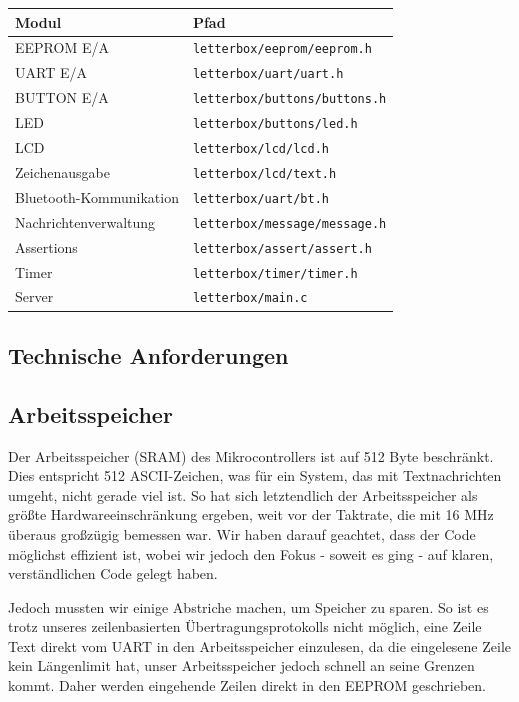 \documentclass[ngerman]{article}
\begin{document}
\begin{tabular}{|l|l|}
    \hline
    {\bf Modul} & {\bf Pfad} \\
    \hline
    \hline
    EEPROM E/A & {\tt letterbox/eeprom/eeprom.h} \\
    \hline
    UART E/A & {\tt letterbox/uart/uart.h} \\
    \hline
    BUTTON E/A & {\tt letterbox/buttons/buttons.h} \\
    \hline
    LED & {\tt letterbox/buttons/led.h} \\
    \hline
    LCD & {\tt letterbox/lcd/lcd.h} \\
    \hline
    Zeichenausgabe & {\tt letterbox/lcd/text.h} \\
    \hline
    Bluetooth-Kommunikation & {\tt letterbox/uart/bt.h} \\
    \hline
    Nachrichtenverwaltung & {\tt letterbox/message/message.h} \\
    \hline
    Assertions & {\tt letterbox/assert/assert.h} \\
    \hline
    Timer & {\tt letterbox/timer/timer.h} \\
    \hline
    Server & {\tt letterbox/main.c} \\
    \hline
\end{tabular}


\subsection{Technische Anforderungen}

\subsection{Arbeitsspeicher}

Der Arbeitsspeicher (SRAM) des Mikrocontrollers ist auf 512 Byte beschränkt.
Dies entspricht 512 ASCII-Zeichen, was für ein System, das mit Textnachrichten
umgeht, nicht gerade viel ist. So hat sich letztendlich der Arbeitsspeicher als
größte Hardwareeinschränkung ergeben, weit vor der Taktrate, die mit 16 MHz
überaus großzügig bemessen war. Wir haben darauf geachtet, dass der Code
möglichst effizient ist, wobei wir jedoch den Fokus - soweit es ging - auf klaren,
verständlichen Code gelegt haben.

Jedoch mussten wir einige Abstriche machen, um Speicher zu sparen. So ist
es trotz unseres zeilenbasierten Übertragungsprotokolls nicht möglich, eine
Zeile Text direkt vom UART in den Arbeitsspeicher einzulesen, da die
eingelesene Zeile kein Längenlimit hat, unser Arbeitsspeicher jedoch schnell
an seine Grenzen kommt. Daher werden eingehende Zeilen direkt in den EEPROM
geschrieben.
\end{document}
